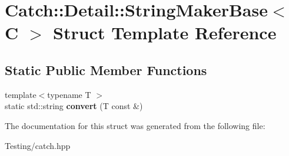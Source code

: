 \hypertarget{struct_catch_1_1_detail_1_1_string_maker_base}{\section{Catch\-:\-:Detail\-:\-:String\-Maker\-Base$<$ C $>$ Struct Template Reference}
\label{struct_catch_1_1_detail_1_1_string_maker_base}
}
\subsection*{Static Public Member Functions}
\begin{DoxyCompactItemize}
\item 
\hypertarget{struct_catch_1_1_detail_1_1_string_maker_base_a8eb9f635dc413a5758e22614bafaf1a3}{{\footnotesize template$<$typename T $>$ }\\static std\-::string {\bfseries convert} (T const \&)}\label{struct_catch_1_1_detail_1_1_string_maker_base_a8eb9f635dc413a5758e22614bafaf1a3}

\end{DoxyCompactItemize}


The documentation for this struct was generated from the following file\-:\begin{DoxyCompactItemize}
\item 
Testing/catch.\-hpp\end{DoxyCompactItemize}
